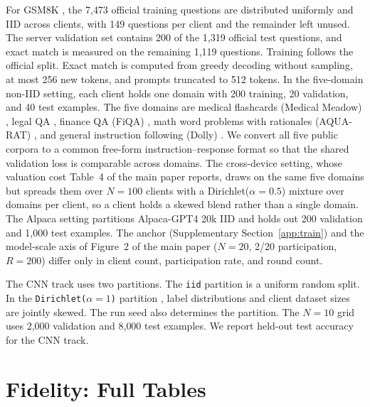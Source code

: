 \documentclass[letterpaper]{article} %
\theoremstyle{plain}
\begin{document}
For GSM8K \citep{cobbe2021training}, the 7{,}473 official training questions are distributed uniformly
and IID across clients, with 149 questions per client and the remainder left
unused. The server validation
set contains 200 of the 1{,}319 official test questions, and exact match is
measured on the remaining 1{,}119 questions. Training follows the official
split. Exact match is computed from greedy decoding without sampling, at most
256 new tokens, and prompts truncated to 512 tokens. In the five-domain non-IID
setting, each client holds one domain with 200 training, 20 validation, and 40
test examples. The five domains are medical
flashcards (Medical Meadow) \citep{han2023medalpaca}, legal QA
\citep{legalqa}, finance QA
(FiQA) \citep{maia201818}, math word problems with rationales (AQUA-RAT)
\citep{ling2017program}, and general instruction following (Dolly)
\citep{conover2023free}. We convert all five
public corpora to a common free-form
instruction--response format so that the shared validation loss is comparable
across domains. The cross-device setting, whose valuation cost Table~4 of the
main paper reports, draws on the same five domains but spreads them over
$N{=}100$ clients with a Dirichlet($\alpha{=}0.5$) mixture over domains per
client, so a client holds a skewed blend rather than a single domain. The
Alpaca setting partitions Alpaca-GPT4 \citep{peng2023instruction} 20k IID and holds out 200 validation
and 1{,}000 test examples. The anchor (Supplementary
Section~\ref{app:train}) and the model-scale axis of Figure~2 of the main
paper ($N{=}20$, 2/20 participation, $R{=}200$) differ only in client count,
participation rate, and round count.

The CNN track uses two partitions. The \texttt{iid} partition is a uniform
random split. In the \texttt{Dirichlet($\alpha{=}1$)} partition
\citep{hsu2019measuring}, label
distributions and client dataset sizes are jointly skewed. The run seed also
determines the partition. The $N{=}10$ grid uses 2{,}000 validation and
8{,}000 test examples. We report held-out test accuracy for the CNN track.

\section{Fidelity: Full Tables}
\label{app:fidelity}
\end{document}
